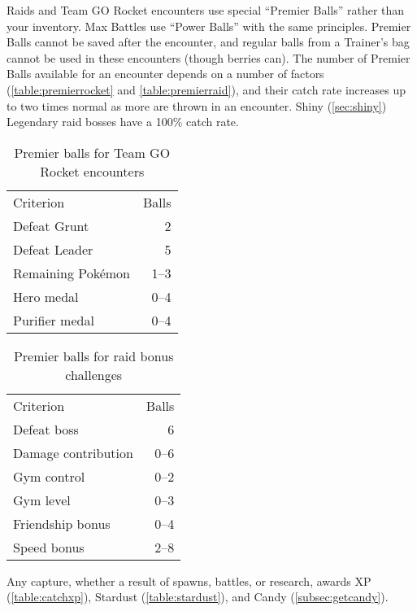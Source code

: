 Raids and Team GO Rocket encounters use special ``Premier Balls'' rather than your inventory.
Max Battles use ``Power Balls'' with the same principles.
Premier Balls cannot be saved after the encounter, and regular balls from
  a Trainer's bag cannot be used in these encounters (though berries can).
The number of Premier Balls available for an encounter depends on a number of factors (\autoref{table:premierrocket}
  and \autoref{table:premierraid}), and their catch rate increases up to two times normal as more are thrown in an encounter.
Shiny (\autoref{sec:shiny}) Legendary raid bosses have a 100\% catch rate.
\begin{table}
\centering
\begin{tabular}{lr}
Criterion & Balls\\
\Midrule
Defeat Grunt & 2\\
Defeat Leader & 5\\
Remaining Pokémon & 1--3\\
Hero medal & 0--4\\
Purifier medal & 0--4\\
\end{tabular}
  \caption{Premier balls for Team GO Rocket encounters\label{table:premierrocket}}
\end{table}
\begin{table}
\centering
\begin{tabular}{lr}
Criterion & Balls\\
\Midrule
  Defeat boss & 6\\
  Damage contribution & 0--6\\
  Gym control & 0--2\\
  Gym level & 0--3\\
  Friendship bonus & 0--4\\
  Speed bonus & 2--8\\
\end{tabular}
  \caption{Premier balls for raid bonus challenges\label{table:premierraid}}
\end{table}
Any capture, whether a result of spawns, battles, or research, awards XP (\autoref{table:catchxp}),
 Stardust (\autoref{table:stardust}), and Candy (\autoref{subsec:getcandy}).
